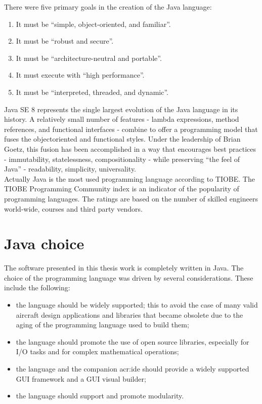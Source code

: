 There were five primary goals in the creation of the Java language:\cite{java}
\begin{enumerate}
\item It must be ``simple, object-oriented, and familiar''.
\item It must be ``robust and secure''.
\item It must be ``architecture-neutral and portable''.
\item It must execute with ``high performance''.
\item It must be ``interpreted, threaded, and dynamic''.
\end{enumerate}
Java SE 8 represents the single largest evolution of the Java language in its history. A relatively small number of features - lambda expressions, method references, and functional interfaces - combine to offer a programming model that fuses the objectoriented
and functional styles. Under the leadership of Brian Goetz, this fusion has been accomplished in a way that encourages best practices - immutability, statelessness, compositionality - while preserving ``the feel of Java'' - readability, simplicity, universality.\\
Actually Java is the most used programming language according to TIOBE. The TIOBE Programming Community index is an indicator of the popularity of programming languages. The ratings are based on the number of skilled engineers world-wide, courses and third party vendors.


\section{Java choice}

The software presented in this thesis work is completely written in Java. The choice of the programming language was driven by several considerations. These include the following:

\begin{itemize}
\item the language should be widely supported; this to avoid the case of many valid aircraft design applications and libraries that became obsolete due to the aging of the programming language used to build them;
\item the language should promote the use of open source libraries, especially for I/O tasks and for complex mathematical operations;
\item the language and the companion \gls{acr:ide} should provide a widely supported \gls{GUI} framework and a \gls{GUI} visual builder;
\item  the language should support and promote modularity.
\end{itemize}


